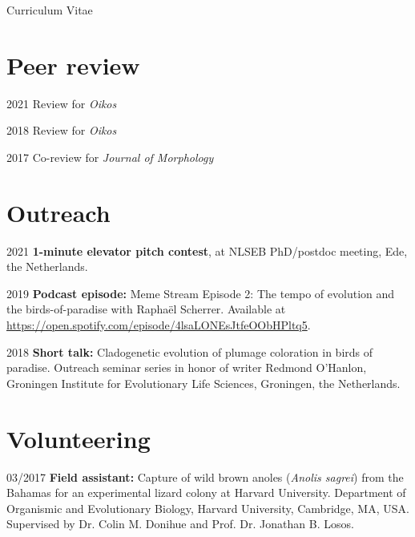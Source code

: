 \documentclass[11pt,a4paper]{article}
\begin{document}
\begin{cv}{Curriculum Vitae}
\begin{cvlist}{}
		\end{cvlist}
		
		\section{Peer review}
		
		\begin{cvlist}{}
		\item[2021] Review for \textit{Oikos}
		\item[2018] Review for \textit{Oikos}
		\item[2017] Co-review for \textit{Journal of Morphology}
		\end{cvlist}
		
		\section{Outreach}
		
		\begin{cvlist}{}
			
			\item[2021] \textbf{1-minute elevator pitch contest}, at NLSEB PhD/postdoc meeting, Ede, the Netherlands.
			
			\item[2019] \textbf{Podcast episode:} Meme Stream Episode 2: The tempo of evolution and the birds-of-paradise with Raphaël Scherrer. Available at \url{https://open.spotify.com/episode/4lsaLONEsJtfeOObHPltq5}.
			
			\item[2018] \textbf{Short talk:} Cladogenetic evolution of plumage coloration in birds of paradise. Outreach seminar series in honor of writer Redmond O'Hanlon, Groningen Institute for Evolutionary Life Sciences, Groningen, the Netherlands.
	
		\end{cvlist}
		
		\section{Volunteering}
		
		\begin{cvlist}{}
		
			\item[03/2017] \textbf{Field assistant:} Capture of wild brown anoles (\textit{Anolis sagrei}) from the Bahamas for an experimental lizard colony at Harvard University. Department of Organismic and Evolutionary Biology, Harvard University, Cambridge, MA, USA. Supervised by Dr. Colin M. Donihue and Prof. Dr. Jonathan B. Losos.
		

\end{cvlist}
\end{cv}
\end{document}
